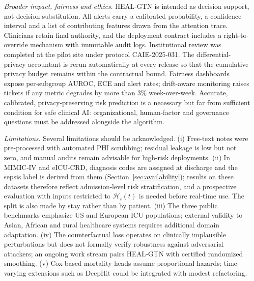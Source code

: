 \documentclass[conference]{IEEEtran}
\begin{document}
\textit{Broader impact, fairness and ethics.} HEAL-GTN is intended as decision support, not decision substitution. All alerts carry a calibrated probability, a confidence interval and a list of contributing features drawn from the attention trace. Clinicians retain final authority, and the deployment contract includes a right-to-override mechanism with immutable audit logs. Institutional review was completed at the pilot site under protocol CAIE-2025-031. The differential-privacy accountant \cite{mironov2017} is rerun automatically at every release so that the cumulative privacy budget remains within the contractual bound. Fairness dashboards expose per-subgroup AUROC, ECE and alert rates; drift-aware monitoring raises tickets if any metric degrades by more than 3\% week-over-week. Accurate, calibrated, privacy-preserving risk prediction is a necessary but far from sufficient condition for safe clinical AI: organizational, human-factor and governance questions must be addressed alongside the algorithm.

\textit{Limitations.} Several limitations should be acknowledged. (i) Free-text notes were pre-processed with automated PHI scrubbing; residual leakage is low but not zero, and manual audits remain advisable for high-risk deployments. (ii) In MIMIC-IV and eICU-CRD, diagnosis codes are assigned at discharge and the sepsis label is derived from them (Section~\ref{sec:availability}); results on these datasets therefore reflect admission-level risk stratification, and a prospective evaluation with inputs restricted to $\mathcal{H}_i(t)$ is needed before real-time use. The split is also made by stay rather than by patient. (iii) The three public benchmarks emphasize US and European ICU populations; external validity to Asian, African and rural healthcare systems requires additional domain adaptation. (iv) The counterfactual loss operates on clinically implausible perturbations but does not formally verify robustness against adversarial attackers; an ongoing work stream pairs HEAL-GTN with certified randomized smoothing. (v) Cox-based mortality heads assume proportional hazards; time-varying extensions such as DeepHit \cite{lee2018deephit} could be integrated with modest refactoring.
\end{document}
